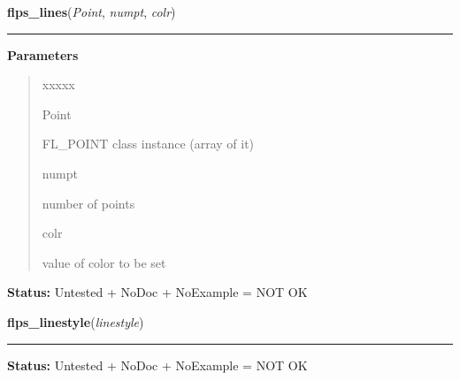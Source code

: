     \label{xformslib:library:flps_lines}

    \vspace{0.5ex}

\hspace{.8\funcindent}\begin{boxedminipage}{\funcwidth}

    \raggedright \textbf{flps\_lines}(\textit{Point}, \textit{numpt}, \textit{colr})

    \vspace{-1.5ex}

    \rule{\textwidth}{0.5\fboxrule}
\setlength{\parskip}{2ex}
\setlength{\parskip}{1ex}
      \textbf{Parameters}
      \vspace{-1ex}

      \begin{quote}
        \begin{Ventry}{xxxxx}

          \item[Point]

          FL\_POINT class instance (array of it)

          \item[numpt]

          number of points

          \item[colr]

          value of color to be set

        \end{Ventry}

      \end{quote}

\textbf{Status:} Untested + NoDoc + NoExample = NOT OK



    \end{boxedminipage}

    \label{xformslib:library:flps_linestyle}

    \vspace{0.5ex}

\hspace{.8\funcindent}\begin{boxedminipage}{\funcwidth}

    \raggedright \textbf{flps\_linestyle}(\textit{linestyle})

    \vspace{-1.5ex}

    \rule{\textwidth}{0.5\fboxrule}
\setlength{\parskip}{2ex}
\setlength{\parskip}{1ex}
\textbf{Status:} Untested + NoDoc + NoExample = NOT OK



    \end{boxedminipage}

